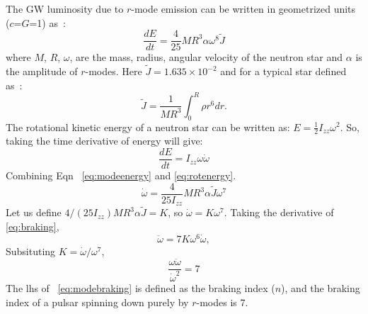 \documentclass{ttuthes2007}
\begin{document}
The \ac{GW} luminosity due to $r$-mode emission can be written in geometrized
units ($c$=$G$=1) as~\cite{Owen_2010}:
\begin{equation}\label{eq:modeenergy}
\frac{dE}{dt}=\frac{4}{25}M R^3 \alpha \omega^8\tilde{J}
\end{equation}
where $M$, $R$, $\omega$, are the mass, radius, angular velocity of the neutron
star and $\alpha$ is the amplitude of $r$-modes. Here $\tilde{J}=1.635\times10^{-2}$ and
for a typical star defined as~\cite{Owen:1998xg}:
\begin{equation}
\tilde{J}=\frac{1}{MR^3}\int_0^R\rho r^6dr.
\end{equation}
The rotational kinetic energy of a neutron star can be written as:
$E=\frac{1}{2}I_{zz}\omega^2$. So, taking the time derivative of energy will give:
\begin{equation}\label{eq:rotenergy}
\frac{dE}{dt}= I_{zz}\omega\dot{\omega}
\end{equation}
Combining Eqn ~\ref{eq:modeenergy} and \ref{eq:rotenergy}.
\begin{equation}\label{eq:braking}
\dot{\omega}=\frac{4}{25 I_{zz}}M R^3 \alpha\tilde{J} \omega^7 
\end{equation}
Let us define $4/(25 I_{zz})M R^3 \alpha\tilde{J}=K$, so $\dot{\omega}=K
\omega^7$. 
Taking the derivative of \ref{eq:braking},
\begin{equation}
\ddot{\omega}= 7K\omega^6\dot{\omega},
\end{equation}
Subsituting $K=\dot{\omega}/\omega^7$,
\begin{equation}\label{eq:modebraking}
\frac{\omega\ddot{\omega}}{\dot{\omega}^2}=7
\end{equation}
The lhs of  ~\ref{eq:modebraking} is defined as the braking index ($n$), and the
braking index of a pulsar spinning down purely by $r$-modes is 7. 
\end{document}

